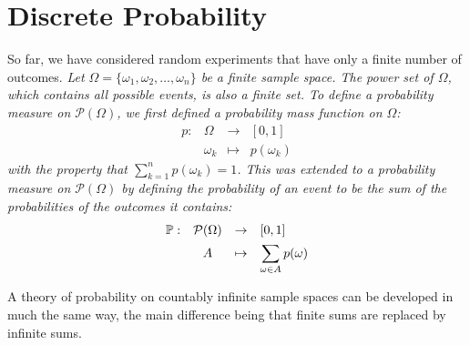 \chapter{Discrete Probability}\label{chap:discrete}


So far, we have considered random experiments that have only a finite number of outcomes.
\bit
\it Let $\Omega = \{\omega_1,\omega_2,\ldots,\omega_n\}$ be a finite sample space.
\it The power set of $\Omega$, which contains all possible events, is also a finite set.
\eit
To define a probability measure on $\mathcal{P}(\Omega)$, we first defined a \emph{probability mass function} on $\Omega$:
\[
\begin{array}{rccl}
	p :	& \Omega		& \to		& [0,1] \\
		& \omega_k		& \mapsto	& p(\omega_k)
\end{array}
\]
with the property that $\displaystyle\sum_{k=1}^n p(\omega_k) = 1$. 
This was extended to a probability measure on $\mathcal{P}(\Omega)$ by defining the probability of an event to be the sum of the probabilities of the outcomes it contains:
\[
\begin{array}{rccl}
	\mathbb{P}:	& \mathcal{P}(\Omega)	& \to		& [0,1] \\[1ex]
			& A						& \mapsto	& \displaystyle\sum_{\omega\in A} p(\omega)
\end{array}
\]


A theory of probability on countably infinite sample spaces can be developed in much the same way, the main difference being that finite sums are replaced by infinite sums.


